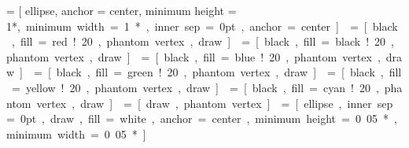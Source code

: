  = [ ellipse, 
                               anchor = center, 
                               minimum height = 1*\unit, 
                               minimum width  = 1*\unit,
                               inner sep=0pt,
                               anchor=center]
   = [black, fill = red!20,   phantom vertex, draw]
 = [black, fill = black!20, phantom vertex, draw]
  = [black, fill = blue!20,  phantom vertex, draw]
 = [black, fill = green!20,  phantom vertex, draw]
 = [black, fill = yellow!20,  phantom vertex, draw]
 = [black, fill = cyan!20,  phantom vertex, draw]
       = [draw, phantom vertex]

 = [ellipse, inner sep=0pt, draw, fill=white, anchor = center,
                     minimum height = 0.05*\unit, minimum width  = 0.05*\unit]
